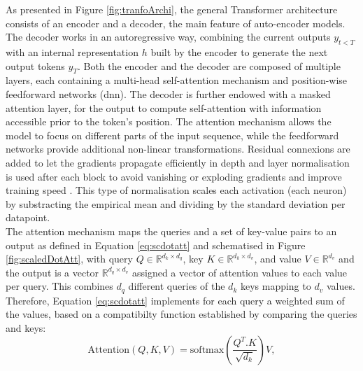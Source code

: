 As presented in Figure \ref{fig:tranfoArchi}, the general Transformer architecture consists of an encoder and a decoder, the main feature of auto-encoder models. The decoder works in an autoregressive way, combining the current outputs $y_{t<T}$ with an internal representation $h$ built by the encoder to generate the next output tokens $y_{T}$. Both the encoder and the decoder are composed of multiple layers, each containing a multi-head self-attention mechanism and position-wise feedforward networks (\gls{dnn}). The decoder is further endowed with a masked attention layer, for the output to compute self-attention with information accessible prior to the token's position. The attention mechanism allows the model to focus on different parts of the input sequence, while the feedforward networks provide additional non-linear transformations. Residual connexions are added to let the gradients propagate efficiently in depth and layer normalisation is used after each block to avoid vanishing or exploding gradients and improve training speed \cite{ba2016layer}. This type of normalisation scales each activation (each neuron) by substracting the empirical mean and dividing by the standard deviation per datapoint. \\
The attention mechanism maps the queries and a set of key-value pairs to an output as defined in Equation \ref{eq:scdotatt} and schematised in Figure \ref{fig:scaledDotAtt}, with query $Q \in \mathbb{R}^{d_k \times d_q}$, key $K \in \mathbb{R}^{d_k \times d_v}$, and value $V \in \mathbb{R}^{d_v}$ and the output is a vector $\mathbb{R}^{d_q \times d_v}$ assigned a vector of attention values to each value per query. This combines $d_q$ different queries of the $d_k$ keys mapping to $d_v$ values. Therefore, Equation \ref{eq:scdotatt} implements for each query a weighted sum of the values, based on a compatibilty function established by comparing the queries and keys:
\begin{equation}\label{eq:scdotatt}
    \text{Attention}(Q, K, V) = \text{softmax}\left( \frac{Q^T . K}{\sqrt{d_k}}\right) V,
\end{equation} 
